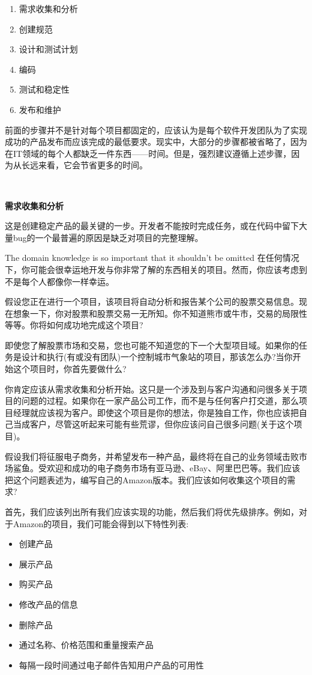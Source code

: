 \begin{enumerate}
	\item 需求收集和分析
	\item 创建规范
	\item 设计和测试计划
	\item 编码
	\item 测试和稳定性
	\item 发布和维护
\end{enumerate}

前面的步骤并不是针对每个项目都固定的，应该认为是每个软件开发团队为了实现成功的产品发布而应该完成的最低要求。现实中，大部分的步骤都被省略了，因为在IT领域的每个人都缺乏一件东西——时间。但是，强烈建议遵循上述步骤，因为从长远来看，它会节省更多的时间。 \par

\noindent\textbf{}\ \par
\textbf{需求收集和分析} \ \par
这是创建稳定产品的最关键的一步。开发者不能按时完成任务，或在代码中留下大量bug的一个最普遍的原因是缺乏对项目的完整理解。 \par
The domain knowledge is so important that it shouldn't be omitted 在任何情况下，你可能会很幸运地开发与你非常了解的东西相关的项目。然而，你应该考虑到不是每个人都像你一样幸运。 \par
假设您正在进行一个项目，该项目将自动分析和报告某个公司的股票交易信息。现在想象一下，你对股票和股票交易一无所知。你不知道熊市或牛市，交易的局限性等等。你将如何成功地完成这个项目? \par
即使您了解股票市场和交易，您也可能不知道您的下一个大型项目域。如果你的任务是设计和执行(有或没有团队)一个控制城市气象站的项目，那该怎么办?当你开始这个项目时，你首先要做什么? \par
你肯定应该从需求收集和分析开始。这只是一个涉及到与客户沟通和问很多关于项目的问题的过程。如果你在一家产品公司工作，而不是与任何客户打交道，那么项目经理就应该视为客户。即使这个项目是你的想法，你是独自工作，你也应该把自己当成客户，尽管这听起来可能有些荒谬，但你应该问自己很多问题(关于这个项目)。 \par
假设我们将征服电子商务，并希望发布一种产品，最终将在自己的业务领域击败市场鲨鱼。受欢迎和成功的电子商务市场有亚马逊、eBay、阿里巴巴等。我们应该把这个问题表述为，编写自己的Amazon版本。我们应该如何收集这个项目的需求? \par
首先，我们应该列出所有我们应该实现的功能，然后我们将优先级排序。例如，对于Amazon的项目，我们可能会得到以下特性列表: \par

\begin{itemize}
	\item 创建产品
	\item 展示产品
	\item 购买产品
	\item 修改产品的信息
	\item 删除产品
	\item 通过名称、价格范围和重量搜索产品
	\item 每隔一段时间通过电子邮件告知用户产品的可用性
\end{itemize}

